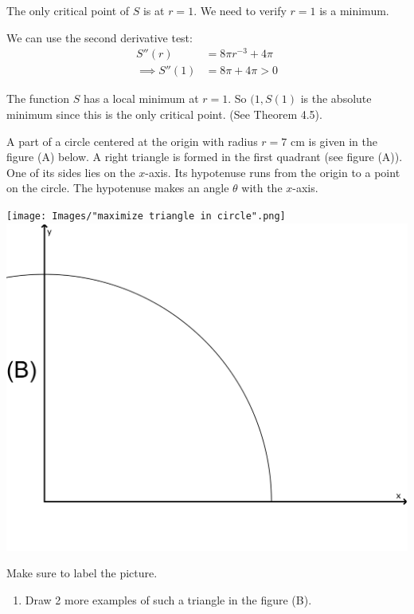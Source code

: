 \documentclass[nooutcomes]{ximera}
\begin{document}
\begin{problem}
\begin{freeResponse}
The only critical point of $S$ is at $r=1$.  We need to verify $r=1$ is a minimum.

We can use the second derivative test:
\begin{align*}
S''(r)&=8\pi r^{-3}+4\pi\\
\implies S''(1)&=8\pi+4\pi>0
\end{align*}

The function $S$ has a local minimum at $r=1$.  So $(1,S(1)$ is the absolute minimum since this is the only critical point.  (See Theorem 4.5).


\end{freeResponse}

\end{problem}

\begin{problem}

  A part of a circle centered at the origin with radius $r = 7 \text{ cm}$ is given in the figure (A) below.
  A right triangle is formed in the first quadrant (see figure (A)).
  One of its sides lies on the $x$-axis.
  Its hypotenuse runs from the origin to a point on the circle.
  The hypotenuse makes an angle $\theta$ with the $x$-axis.

  \begin{image}
    \texttt{[image: Images/"maximize triangle in circle".png]}
    \includegraphics[scale = 0.2]{Images/figure7.png}
  \end{image}
  Make sure to label the picture.

  \begin{enumerate}
    \item
      Draw 2 more examples of such a triangle in the figure (B).
      \begin{freeResponse} \hfil
      

\end{freeResponse}
\end{enumerate}
\end{problem}
\end{document}
